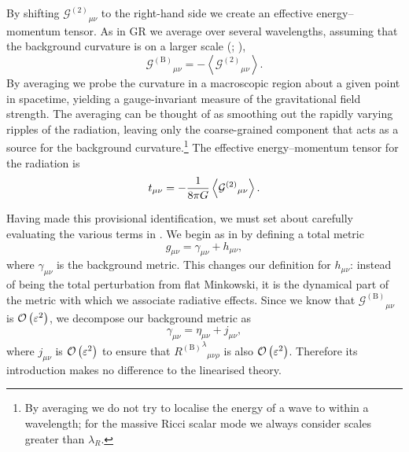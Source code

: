 By shifting ${\mathcal{G}^{(2)}}_{\mu\nu}$ to the right-hand side we create an effective energy--momentum tensor. As in GR we average over several wavelengths, assuming that the background curvature is on a larger scale (\citealt[section 35.13]{Misner1973}; \citealt{Stein2011}),
\begin{equation}
{\mathcal{G}^{(\text{B})}}_{\mu\nu} = -\left\langle{\mathcal{G}^{(2)}}_{\mu\nu}\right\rangle.
\end{equation}
By averaging we probe the curvature in a macroscopic region about a given point in spacetime, yielding a gauge-invariant measure of the gravitational field strength. The averaging can be thought of as smoothing out the rapidly varying ripples of the radiation, leaving only the coarse-grained component that acts as a source for the background curvature.\footnote{By averaging we do not try to localise the energy of a wave to within a wavelength; for the massive Ricci scalar mode we always consider scales greater than $\lambda_R$.} The effective energy--momentum tensor for the radiation is
\begin{equation}
t_{\mu\nu} = -\dfrac{1}{8\pi G}\left\langle{\mathcal{G}^{(\text{2})}}_{\mu\nu}\right\rangle.
\end{equation}

Having made this provisional identification, we must set about carefully evaluating the various terms in . We begin as in  by defining a total metric
\begin{equation}
g_{\mu\nu} = \gamma_{\mu\nu} + h_{\mu\nu},
\end{equation}
where $\gamma_{\mu\nu}$ is the background metric. This changes our definition for $h_{\mu\nu}$: instead of being the total perturbation from flat Minkowski, it is the dynamical part of the metric with which we associate radiative effects. Since we know that ${\mathcal{G}^{(\text{B})}}_{\mu\nu}$ is $\mathcal{O}\left({\varepsilon^2}\right)$, we decompose our background metric as
\begin{equation}
\gamma_{\mu\nu} = \eta_{\mu\nu} + j_{\mu\nu},
\end{equation}
where $j_{\mu\nu}$ is $\mathcal{O}\left({\varepsilon^2}\right)$ to ensure that ${{R^{(\text{B})}}^\lambda}_{\mu\nu\rho}$ is also $\mathcal{O}\left({\varepsilon^2}\right)$. Therefore its introduction makes no difference to the linearised theory.

